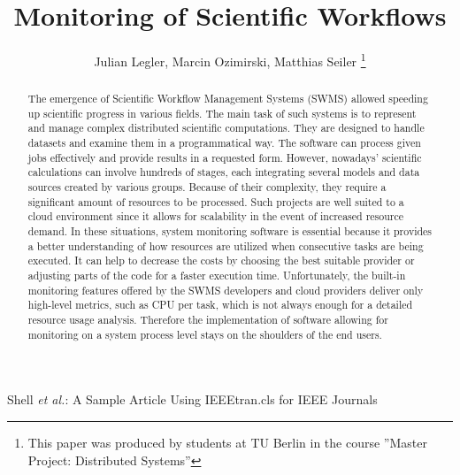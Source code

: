 \documentclass[lettersize,journal]{IEEEtran}
\begin{document}
	
	\title{Monitoring of Scientific Workflows}
	
	\author{Julian Legler, Marcin Ozimirski, Matthias Seiler
		\thanks{This paper was produced by students at TU Berlin in the course ''Master Project: Distributed Systems''}%
	}
	
	{Shell \MakeLowercase{\textit{et al.}}: A Sample Article Using IEEEtran.cls for IEEE Journals}
	
	
	\maketitle
	
	\begin{abstract}
		
		The emergence of Scientific Workflow Management Systems (SWMS) allowed speeding up scientific progress in various fields. The main task of such systems is to represent and manage complex distributed scientific computations. They are designed to handle datasets and examine them in a programmatical way. The software can process given jobs effectively and provide results in a requested form. However, nowadays' scientific calculations can involve hundreds of stages, each integrating several models and data sources created by various groups. Because of their complexity, they require a significant amount of resources to be processed. Such projects are well suited to a cloud environment since it allows for scalability in the event of increased resource demand. In these situations, system monitoring software is essential because it provides a better understanding of how resources are utilized when consecutive tasks are being executed. It can help to decrease the costs by choosing the best suitable provider or adjusting parts of the code for a faster execution time. Unfortunately, the built-in monitoring features offered by the SWMS developers and cloud providers deliver only high-level metrics, such as CPU per task, which is not always enough for a detailed resource usage analysis. Therefore the implementation of software allowing for monitoring on a system process level stays on the shoulders of the end users. 
		
		
	\end{abstract}
	
\end{document}
